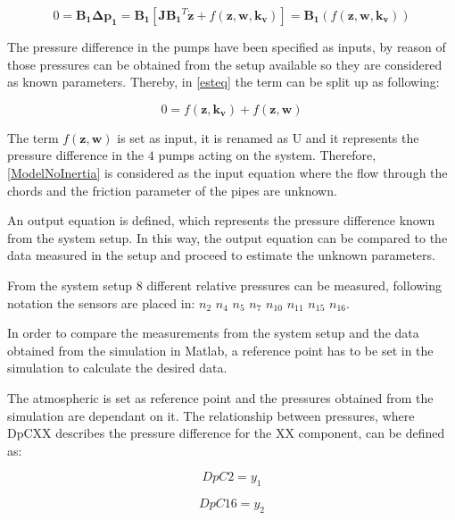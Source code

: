 \begin{equation}
  0 = \pmb{B_1 \Delta p_1 }= \pmb{B_1} [ \pmb{J {B_1}}^T \pmb{\dot{z}} + f(\pmb{z},\pmb{ w}, \pmb{k_v})]  = \pmb{ B_1} (f(\pmb{z}, \pmb{w},\pmb{ k_v}))
  \label{esteq}
 \end{equation}
 
The pressure difference in the pumps have been specified as inputs, by reason of those pressures can be obtained from the setup available so they are considered 
as known parameters. Thereby, in \eqref{esteq} the term can be split up as following:
 
\begin{equation}
 0 = f(\pmb{z},\pmb{k_v})+ f(\pmb{z},\pmb{w})
 \label{ModelNoInertia}
\end{equation}

The term $f(\pmb{z},\pmb{w})$ is set as input, it is renamed as U and it represents the pressure difference in the $4$ pumps acting on the system. Therefore, 
\eqref{ModelNoInertia} is considered as the input equation where the flow through the chords and the friction parameter of the pipes are unknown. 

An output equation is defined, which represents the pressure difference known from the system setup. In this way, the output equation can be compared 
to the data measured in the setup and proceed to estimate the unknown parameters. 

From the system setup $8$ different relative pressures can be measured, following  notation the sensors are placed in: 
$n_2$ $n_4$ $n_5$ $n_7$ $n_{10}$ $n_{11}$ $n_{15}$ $n_{16}$.

In order to compare the measurements from the system setup and the data obtained from the simulation in Matlab, a reference point has to be set in the 
simulation to calculate the desired data. 

The atmospheric is set as reference point and the pressures obtained from the simulation are dependant on it. The relationship between pressures, where DpCXX describes
the pressure difference for the XX component, can be defined as:

\vspace{4mm}
\begin{equation}
    DpC2 = y_1
\end{equation}

\vspace{4mm}
\begin{equation}
  DpC16 = y_2
\end{equation}

